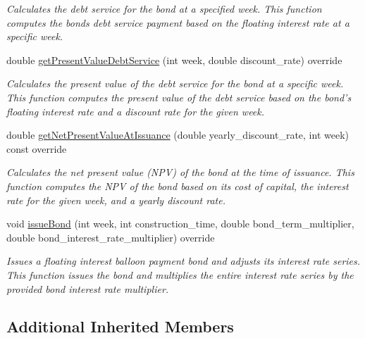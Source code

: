 \begin{DoxyCompactItemize}
\begin{DoxyCompactList}\small\item\em Calculates the debt service for the bond at a specified week. This function computes the bond\textquotesingle{}s debt service payment based on the floating interest rate at a specific week. \end{DoxyCompactList}\item 
double \mbox{\hyperlink{classFloatingInterestBalloonPaymentBond_a91b2fef92f90049a3ba13bcd27c0eff2}{get\+Present\+Value\+Debt\+Service}} (int week, double discount\+\_\+rate) override
\begin{DoxyCompactList}\small\item\em Calculates the present value of the debt service for the bond at a specific week. This function computes the present value of the debt service based on the bond’s floating interest rate and a discount rate for the given week. \end{DoxyCompactList}\item 
double \mbox{\hyperlink{classFloatingInterestBalloonPaymentBond_a90205e26e09eef1227f8c0671ca4fce2}{get\+Net\+Present\+Value\+At\+Issuance}} (double yearly\+\_\+discount\+\_\+rate, int week) const override
\begin{DoxyCompactList}\small\item\em Calculates the net present value (N\+PV) of the bond at the time of issuance. This function computes the N\+PV of the bond based on its cost of capital, the interest rate for the given week, and a yearly discount rate. \end{DoxyCompactList}\item 
void \mbox{\hyperlink{classFloatingInterestBalloonPaymentBond_a4cf110f320c92f5eca9aed952e0b527a}{issue\+Bond}} (int week, int construction\+\_\+time, double bond\+\_\+term\+\_\+multiplier, double bond\+\_\+interest\+\_\+rate\+\_\+multiplier) override
\begin{DoxyCompactList}\small\item\em Issues a floating interest balloon payment bond and adjusts its interest rate series. This function issues the bond and multiplies the entire interest rate series by the provided bond interest rate multiplier. \end{DoxyCompactList}\end{DoxyCompactItemize}
\subsection*{Additional Inherited Members}


